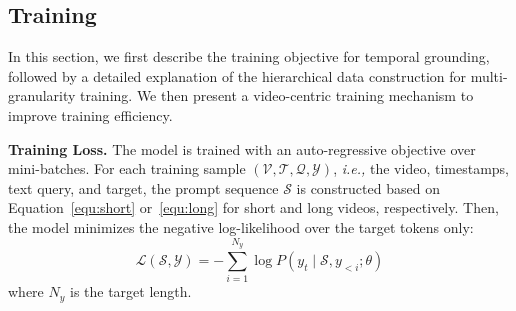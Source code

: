 \subsection{Training}
\label{sec:training}

In this section, we first describe the training objective for temporal grounding, 
followed by a detailed explanation of the hierarchical data construction for multi-granularity training. We then present a video-centric training mechanism to improve training efficiency.

\noindent \textbf{Training Loss.}
The model is trained with an auto-regressive objective over mini-batches. 
For each training sample $(\mathcal{V}, \mathcal{T}, \mathcal{Q}, \mathcal{Y})$, {\em i.e.,} the video, timestamps, text query, and target, the prompt sequence $\mathcal{S}$ is constructed based on Equation~\ref{equ:short} or~\ref{equ:long} for short and long videos, respectively. Then, the model minimizes the negative log-likelihood over the target tokens only:
\begin{equation*}
    \mathcal{L}(\mathcal{S}, \mathcal{Y}) = -\sum_{i=1}^{N_y} \log P(y_t \mid \mathcal{S}, y_{<i}; \theta)
\end{equation*}
where $N_y$ is the target length.

